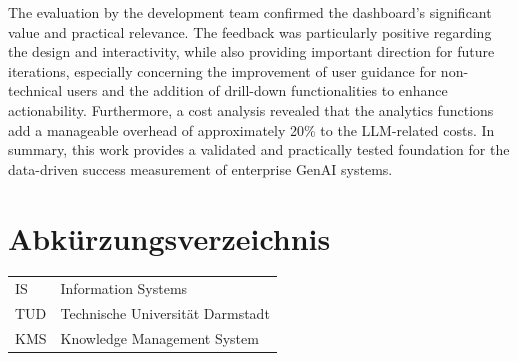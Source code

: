 \documentclass[
	english,
	ruledheaders=section,%
	class=report,%
	thesis={type=bachelor},%
	accentcolor=1b,%
	custommargins=true,%
	marginpar=false,%
	parskip=half-,%
	fontsize=11pt,%
	DIV=14,
]{tudapub}
\begin{document}
The evaluation by the development team confirmed the dashboard's significant value and practical relevance. The feedback was particularly positive regarding the design and interactivity, while also providing important direction for future iterations, especially concerning the improvement of user guidance for non-technical users and the addition of drill-down functionalities to enhance actionability. Furthermore, a cost analysis revealed that the analytics functions add a manageable overhead of approximately 20\% to the LLM-related costs. In summary, this work provides a validated and practically tested foundation for the data-driven success measurement of enterprise GenAI systems.

\tableofcontents




\listoffigures
{}           %

\listoftables
{}           %

\chapter*{Abkürzungsverzeichnis}

\begin{xtabular}{ll}
IS					&	Information Systems\\
TUD					&	Technische Universität Darmstadt\\
KMS                 &   Knowledge Management System \\

\end{xtabular} 
\end{document}
